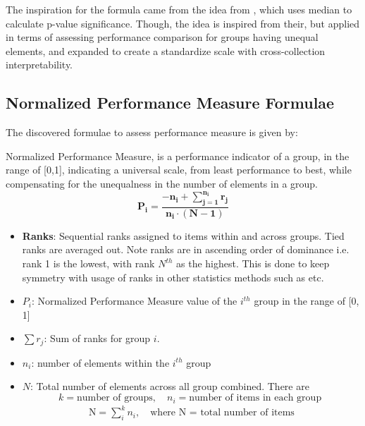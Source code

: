 \documentclass[a4paper,fleqn,review]{cas-sc}
\begin{document}
The inspiration for the formula came from the idea from \cite{mann1947test}, which uses median to calculate p-value significance. Though, the idea is inspired from their, but applied in terms of assessing performance comparison
for groups having unequal elements, and expanded to create a standardize scale with cross-collection interpretability.

\subsection{Normalized Performance Measure Formulae}
The discovered formulae to assess performance measure is given by:

\begin{normalizedPerformanceMeasure}
	Normalized Performance Measure, is a performance indicator of a group, in the range of [0,1], indicating a universal scale, from least performance to best, while compensating for the unequalness in the number of elements in a group.
	\begin{equation}
		\boxed{
			\mathbf{
				P_i = \frac{-n_i +  \sum\limits_{j=1}^{n_i} r_j}{n_i \cdot (N - 1)}}
		}
	\end{equation}
	
	
	\begin{itemize}
		\item \textbf{Ranks}: Sequential ranks assigned to items within and across groups. Tied ranks are averaged out. Note ranks are in ascending order of dominance i.e. rank 1 is the lowest, with rank $N^{th}$ as the highest. This is done to keep symmetry with usage of ranks in other statistics methods such as \cite{mann1947test} etc.
		\item \textbf{$P_i$}: Normalized Performance Measure value of the $i^{th}$ group in the range of [0, 1]
		\item \textbf{$\sum r_j$}: Sum of ranks for group $i$.
		\item \textbf{$n_i$}: number of elements within the $i^{th}$ group
		\item \textbf{$N$}: Total number of elements across all group combined. \hfill \break
		There are \[k = \text{number of groups}, \quad n_i = \text{number of items in each group }\]
		\begin{align}
			\text{N} = \sum\limits_i^k n_i, \quad \text{where N = total number of items}
		\end{align}
		
	\end{itemize}
\end{normalizedPerformanceMeasure}
\end{document}
